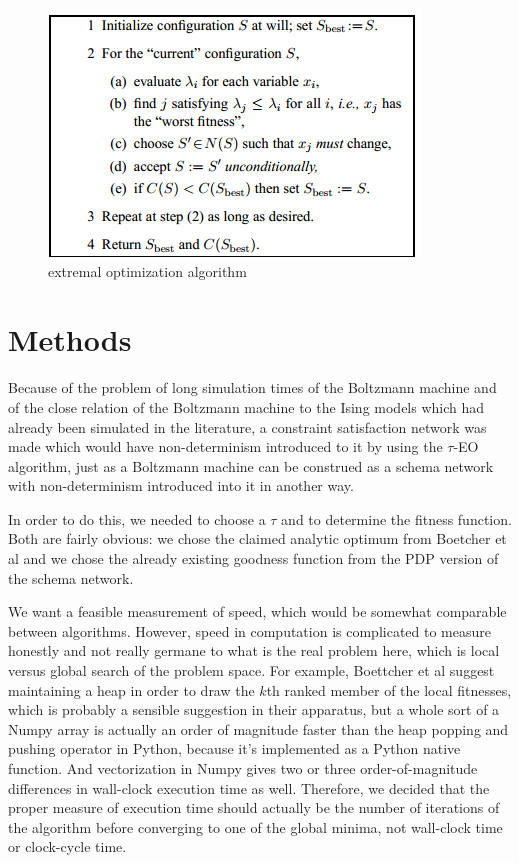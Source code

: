 \documentclass[12pt]{article}
\begin{document}
\begin{figure}
  \includegraphics{eo_alg} %
  \caption{extremal optimization algorithm}
\end{figure}

\section{Methods}

Because of the problem of long simulation times of the Boltzmann machine and of the close relation of the Boltzmann machine to the Ising models which had already been simulated in the literature, a constraint satisfaction network was made which would have non-determinism introduced to it by using the $\tau$-EO algorithm, just as a Boltzmann machine can be construed as a schema network with non-determinism introduced into it in another way.

In order to do this, we needed to choose a $\tau$ and to determine the fitness function. Both are fairly obvious: we chose the claimed analytic optimum from Boetcher et al and we chose the already existing goodness function from the PDP version of the schema network.

We want a feasible measurement of speed, which would be somewhat comparable between algorithms. However, speed in computation is complicated to measure honestly and not really germane to what is the real problem here, which is local versus global search of the problem space. For example, Boettcher et al suggest maintaining a heap in order to draw the $k$th ranked member of the local fitnesses, which is probably a sensible suggestion in their apparatus, but a whole sort of a Numpy array is actually an order of magnitude faster than the heap popping and pushing operator in Python, because it's implemented as a Python native function. And vectorization in Numpy gives two or three order-of-magnitude differences in wall-clock execution time as well. Therefore, we decided that the proper measure of execution time should actually be the number of iterations of the algorithm before converging to one of the global minima, not wall-clock time or clock-cycle time.
\end{document}
